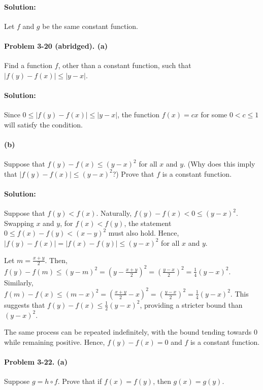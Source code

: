 \documentclass{article}
\begin{document}
\paragraph{Solution:} Let $f$ and $g$ be the same constant function.

\paragraph{Problem 3-20 (abridged). (a)} Find a function $f$, other than a
constant function, such that $|f(y) - f(x)| \leq |y - x|$.

\paragraph{Solution:} Since $0 \leq |f(y) - f(x)| \leq |y - x|$, the
function $f(x) = cx$ for some $0 < c \leq 1$ will satisfy the condition.

\paragraph{(b)} Suppose that $f(y) - f(x) \leq (y - x)^2$ for all $x$ and $y$.
(Why does this imply that $|f(y) - f(x)| \leq (y - x)^2$?) Prove that $f$ is a
constant function.

\paragraph{Solution:} Suppose that $f(y) < f(x)$. Naturally, $f(y) - f(x) < 0
\leq (y - x)^2$. Swapping $x$ and $y$, for $f(x) < f(y)$, the statement $0 \leq
f(x) - f(y) < (x - y)^2$ must also hold. Hence, $|f(y) - f(x)| = |f(x) - f(y)|
\leq (y - x)^2$ for all $x$ and $y$.

Let $m = \frac{x + y}{2}$. Then, $f(y) - f(m) \leq (y - m)^2 = \left(y -
\frac{x + y}{2}\right)^2 = \left(\frac{y - x}{2}\right)^2 = \frac{1}{4}(y -
x)^2$. Similarly, $f(m) - f(x) \leq (m - x)^2 = \left(\frac{x + y}{2} -
x\right)^2 = \left(\frac{y - x}{2}\right)^2 = \frac{1}{4}(y - x)^2$. This
suggests that $f(y) - f(x) \leq \frac{1}{2}(y - x)^2$, providing a stricter
bound than $(y - x)^2$.

The same process can be repeated indefinitely, with the bound tending towards 0
while remaining positive. Hence, $f(y) - f(x) = 0$ and $f$ is a constant
function.

\paragraph{Problem 3-22. (a)} Suppose $g = h \circ f$. Prove that if $f(x) =
f(y)$, then $g(x) = g(y)$.
\end{document}
